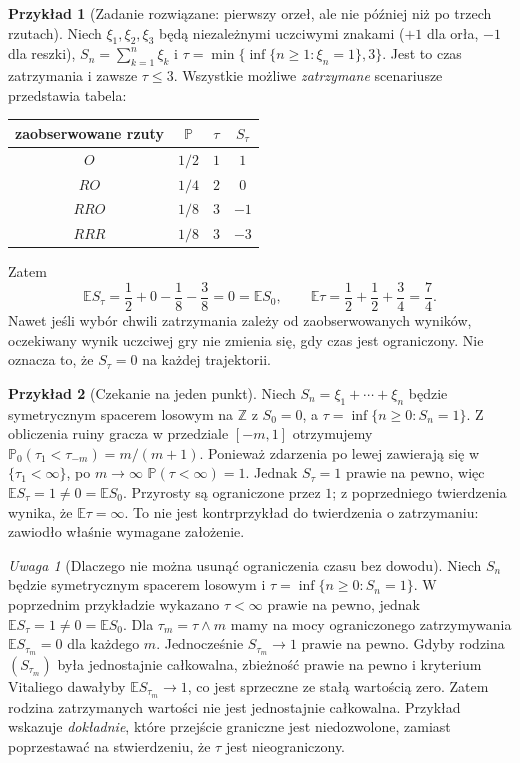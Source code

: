 \documentclass[11pt,a4paper,oneside]{report}
\numberwithin{equation}{chapter}
\theoremstyle{plain}
\theoremstyle{definition}
\newtheorem{przyklad}{Przykład}[chapter]
\theoremstyle{remark}
\newtheorem{uwaga}{Uwaga}[chapter]
\newcommand{\Z}{\mathbb{Z}}
\newcommand{\Prob}{\mathbb{P}}
\newcommand{\E}{\mathbb{E}}
\begin{document}
\begin{przyklad}[Zadanie rozwiązane: pierwszy orzeł, ale nie później niż po trzech rzutach]
Niech $\xi_1,\xi_2,\xi_3$ będą niezależnymi uczciwymi
znakami ($+1$ dla orła, $-1$ dla reszki),
$S_n=\sum_{k=1}^n\xi_k$ i
$\tau=\min\{\inf\{n\geq1:\xi_n=1\},3\}$.
Jest to czas zatrzymania i zawsze $\tau\leq3$.
Wszystkie możliwe \emph{zatrzymane} scenariusze
przedstawia tabela:
\begin{center}
\begin{tabular}{c|c|c|c}
zaobserwowane rzuty & $\Prob$ & $\tau$ & $S_\tau$\\\hline
$O$ & $1/2$ & $1$ & $1$\\
$RO$ & $1/4$ & $2$ & $0$\\
$RRO$ & $1/8$ & $3$ & $-1$\\
$RRR$ & $1/8$ & $3$ & $-3$
\end{tabular}
\end{center}
Zatem
\[
\E S_\tau=\frac12+0-\frac18-\frac38=0
=\E S_0,\qquad
\E\tau=\frac12+\frac12+\frac34=\frac74.
\]
Nawet jeśli wybór chwili zatrzymania zależy od
zaobserwowanych wyników, oczekiwany wynik uczciwej
gry nie zmienia się, gdy czas jest ograniczony.
Nie oznacza to, że $S_\tau=0$ na każdej trajektorii.
\end{przyklad}

\begin{przyklad}[Czekanie na jeden punkt]
Niech $S_n=\xi_1+\cdots+\xi_n$ będzie symetrycznym
spacerem losowym na $\Z$ z $S_0=0$,
a $\tau=\inf\{n\geq0:S_n=1\}$.
Z obliczenia ruiny gracza w przedziale
$[-m,1]$ otrzymujemy
$\Prob_0(\tau_1<\tau_{-m})=m/(m+1)$.
Ponieważ zdarzenia po lewej zawierają się
w $\{\tau_1<\infty\}$, po $m\to\infty$
$\Prob(\tau<\infty)=1$. Jednak $S_\tau=1$
prawie na pewno, więc $\E S_\tau=1\ne0=\E S_0$.
Przyrosty są ograniczone przez $1$;
z poprzedniego twierdzenia wynika, że
$\E\tau=\infty$. To nie jest kontrprzykład
do twierdzenia o zatrzymaniu: zawiodło
właśnie wymagane założenie.
\end{przyklad}



\begin{uwaga}[Dlaczego nie można usunąć ograniczenia czasu bez dowodu]
Niech $S_n$ będzie symetrycznym spacerem losowym i
$\tau=\inf\{n\geq0:S_n=1\}$. W poprzednim przykładzie
wykazano $\tau<\infty$ prawie na pewno, jednak
$\E S_\tau=1\ne0=\E S_0$. Dla
$\tau_m=\tau\wedge m$ mamy na mocy ograniczonego
zatrzymywania $\E S_{\tau_m}=0$ dla każdego $m$.
Jednocześnie $S_{\tau_m}\to1$ prawie na pewno.
Gdyby rodzina $(S_{\tau_m})$ była jednostajnie
całkowalna, zbieżność prawie na pewno i kryterium
Vitaliego dawałyby $\E S_{\tau_m}\to1$, co jest
sprzeczne ze stałą wartością zero.
Zatem rodzina zatrzymanych wartości nie jest
jednostajnie całkowalna. Przykład wskazuje
\emph{dokładnie}, które przejście graniczne jest
niedozwolone, zamiast poprzestawać na stwierdzeniu,
że $\tau$ jest nieograniczony.
\end{uwaga}
\end{document}
